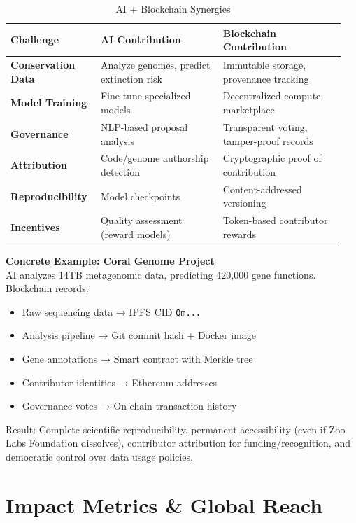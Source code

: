 \documentclass[twocolumn,11pt]{article}
\begin{document}
\begin{table}[t]
\centering
\caption{AI + Blockchain Synergies}
\label{tab:synergies}
\begin{tabular}{@{}p{0.25\linewidth}p{0.35\linewidth}p{0.35\linewidth}@{}}
\toprule
\textbf{Challenge} & \textbf{AI Contribution} & \textbf{Blockchain Contribution} \\ \midrule
\textbf{Conservation Data} & Analyze genomes, predict extinction risk & Immutable storage, provenance tracking \\
\textbf{Model Training} & Fine-tune specialized models & Decentralized compute marketplace \\
\textbf{Governance} & NLP-based proposal analysis & Transparent voting, tamper-proof records \\
\textbf{Attribution} & Code/genome authorship detection & Cryptographic proof of contribution \\
\textbf{Reproducibility} & Model checkpoints & Content-addressed versioning \\
\textbf{Incentives} & Quality assessment (reward models) & Token-based contributor rewards \\
\bottomrule
\end{tabular}
\end{table}

\textbf{Concrete Example: Coral Genome Project} \\
AI analyzes 14TB metagenomic data, predicting 420,000 gene functions. Blockchain records:
\begin{itemize}
    \item Raw sequencing data → IPFS CID \texttt{Qm...}
    \item Analysis pipeline → Git commit hash + Docker image
    \item Gene annotations → Smart contract with Merkle tree
    \item Contributor identities → Ethereum addresses
    \item Governance votes → On-chain transaction history
\end{itemize}

Result: Complete scientific reproducibility, permanent accessibility (even if Zoo Labs Foundation dissolves), contributor attribution for funding/recognition, and democratic control over data usage policies.

\section{Impact Metrics \& Global Reach}
\end{document}
